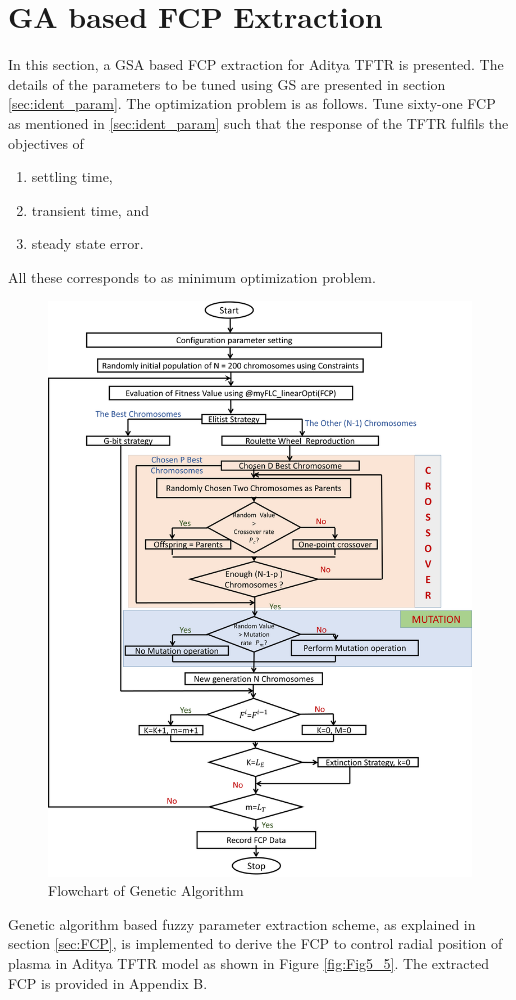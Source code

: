 \section{GA based FCP Extraction}
In this section, a GSA based FCP extraction for Aditya TFTR is presented. The details of the parameters to be tuned using GS are presented in section \ref{sec:ident_param}. The optimization problem is as follows.
Tune sixty-one FCP as mentioned in \ref{sec:ident_param} such that the response of the TFTR fulfils the objectives of
\begin{enumerate}
	\item settling time,
	\item transient time, and
	\item steady state error.
\end{enumerate}

All these corresponds to as minimum optimization problem. 

\begin{figure}[h!]
	\centering
	\includegraphics[width=1\linewidth]{Chapter5/chapter5/Fig12_GA_Full_Flowchart}
	\caption{Flowchart of Genetic Algorithm}
	\label{fig:Fig12_GA_Full_Flowchart}
\end{figure}
Genetic algorithm based fuzzy parameter extraction scheme, as explained in section \ref{sec:FCP}, is implemented to derive the FCP to control radial position of plasma in Aditya TFTR model as shown in Figure \ref{fig:Fig5_5}. The extracted FCP is provided in Appendix B. 

